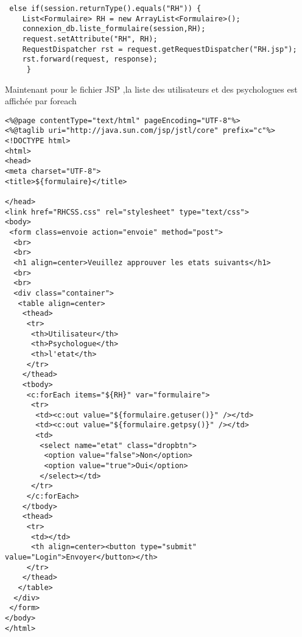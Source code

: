 \documentclass[12]{article}
\begin{document}
\lstset{language=java}
\begin{lstlisting}
 else if(session.returnType().equals("RH")) {
	List<Formulaire> RH = new ArrayList<Formulaire>();
	connexion_db.liste_formulaire(session,RH);
	request.setAttribute("RH", RH);
	RequestDispatcher rst = request.getRequestDispatcher("RH.jsp");
	rst.forward(request, response);
     }
\end{lstlisting}
 Maintenant pour le fichier JSP ,la liste des utilisateurs et des psychologues est affichée par foreach
\lstset{language=java}
\begin{lstlisting}
<%@page contentType="text/html" pageEncoding="UTF-8"%>
<%@taglib uri="http://java.sun.com/jsp/jstl/core" prefix="c"%>
<!DOCTYPE html>
<html>
<head>
<meta charset="UTF-8">
<title>${formulaire}</title>

</head>
<link href="RHCSS.css" rel="stylesheet" type="text/css">
<body>
 <form class=envoie action="envoie" method="post">
  <br>
  <br>
  <h1 align=center>Veuillez approuver les etats suivants</h1>
  <br>
  <br>
  <div class="container">
   <table align=center>
    <thead>
     <tr>
      <th>Utilisateur</th>
      <th>Psychologue</th>
      <th>l'etat</th>
     </tr>
    </thead>
    <tbody>
     <c:forEach items="${RH}" var="formulaire">
      <tr>
       <td><c:out value="${formulaire.getuser()}" /></td>
       <td><c:out value="${formulaire.getpsy()}" /></td>
       <td>
        <select name="etat" class="dropbtn">
         <option value="false">Non</option>
         <option value="true">Oui</option>
        </select></td>
      </tr>
     </c:forEach>
    </tbody>
    <thead>
     <tr>
      <td></td>
      <th align=center><button type="submit" value="Login">Envoyer</button></th>
     </tr>
    </thead>
   </table>
  </div>
 </form>
</body>
</html>

\end{lstlisting}
 
\end{document}
